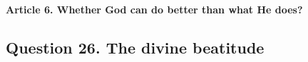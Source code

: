 \documentclass{ucetd}
\begin{document}
\paragraph{Article 6. Whether God can do better than what He does?}
\subsection{Question 26. The divine beatitude}
\end{document}
